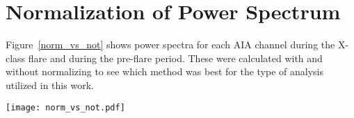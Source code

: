 \section{Normalization of Power Spectrum}

Figure~\ref{norm_vs_not} shows power spectra for each AIA channel
during the X-class flare and during the pre-flare period.
These were calculated with and without normalizing to see which
method was best for the type of analysis utilized in this work.

\begin{figure*}\centering
    \texttt{[image: norm\_vs\_not.pdf]}
    \caption{Fourier power spectrum for quiet vs. flaring times,
    comparing calculations without normalizing (left panels) to
    those with normalizing (right panels) for both AIA 1600\AA{}
    (top) and AIA 1700\AA{} (bottom).
    All spectra were obtained by applying a Fourier transform
    to the integrated emission from AR 11158.
    \label{norm_vs_not}}
\end{figure*}

